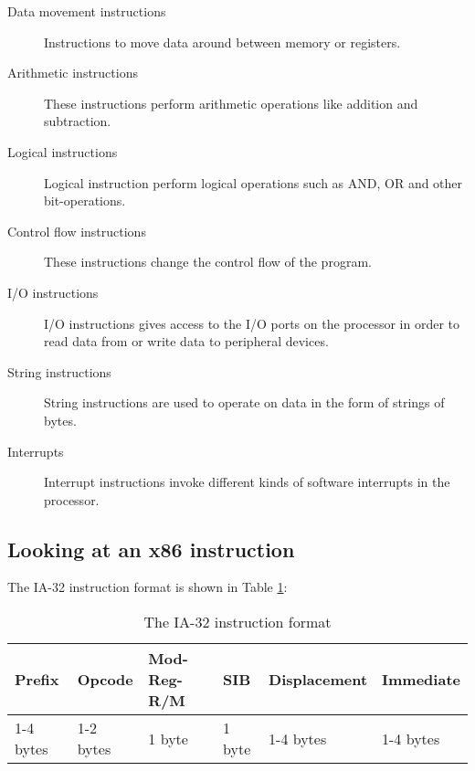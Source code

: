 \documentclass[11pt,twoside]{eitExjobb}
\begin{document}
\begin{description}
\item[Data movement instructions] Instructions to move data around between memory or registers. 
\item[Arithmetic instructions] These instructions perform arithmetic operations like addition and subtraction.
\item[Logical instructions] Logical instruction perform logical operations such as AND, OR and other bit-operations.
\item[Control flow instructions] These instructions change the control flow of the program.
\item[I/O instructions] I/O instructions gives access to the I/O ports on the processor in order to read data from or write data to peripheral devices.
\item[String instructions] String instructions are used to operate on data in the form of strings of bytes.
\item[Interrupts] Interrupt instructions invoke different kinds of software interrupts in the processor.
\end{description}

\subsection{Looking at an x86 instruction}
The IA-32 instruction format is shown in Table \ref{table:ia32instructionformat}: \\

\begin{table}[h]
\begin{tabular}{|l|l|l|l|l|l|}
\hline
Prefix & Opcode & Mod-Reg-R/M & SIB & Displacement & Immediate \\ \hline
1-4 bytes & 1-2 bytes & 1 byte & 1 byte & 1-4 bytes & 1-4 bytes \\
\hline
\end{tabular}
\caption{The IA-32 instruction format}
\label{table:ia32instructionformat}
\end{table}
\end{document}
